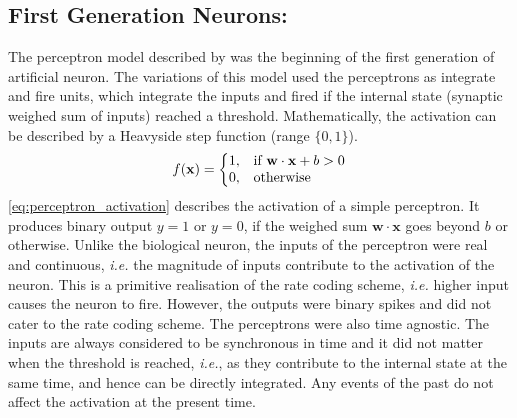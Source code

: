 \subsection{First Generation Neurons:}
The perceptron model described by \citet{rosenblatt1958perceptron} was the beginning of the first generation of artificial neuron. The variations of this model used the perceptrons as integrate and fire units, which integrate the inputs and fired if the internal state (synaptic weighed sum of inputs) reached a threshold. Mathematically, the activation can be described by a Heavyside step function (range $\{0, 1\}$).  
\begin{equation}
f(\mathbf{x})=\left\{
\begin{array}{@{}ll@{}}
1, & \text{if}\ \mathbf{w\cdot x}+b> 0 \\
0, & \text{otherwise}
\end{array}\right.
\label{eq:perceptron_activation}
\end{equation}
\equationname \ref{eq:perceptron_activation} describes the activation of a simple perceptron. It produces binary output $y=1$ or $y=0$, if the weighed sum $\mathbf{w\cdot x}$ goes beyond $b$ or otherwise. Unlike the biological neuron, the inputs of the perceptron were real and continuous, \emph{i.e.} the magnitude of inputs contribute to the activation of the neuron. This is a primitive realisation of the rate coding scheme, \emph{i.e.} higher input causes the neuron to fire. However, the outputs were binary spikes and did not cater to the rate coding scheme. The perceptrons were also time agnostic. The inputs are always considered to be synchronous in time and it did not matter when the threshold is reached, \emph{i.e.}, as they contribute to the internal state at the same time, and hence can be directly integrated. Any events of the past do not affect the activation at the present time. 


